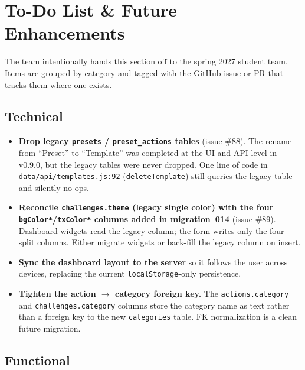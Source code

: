 \documentclass[11pt,letterpaper]{article}
\begin{document}
\section{To-Do List \& Future Enhancements}

The team intentionally hands this section off to the spring 2027
student team. Items are grouped by category and tagged with the
GitHub issue or PR that tracks them where one exists.

\subsection{Technical}

\begin{itemize}
  \item \textbf{Drop legacy \texttt{presets} / \texttt{preset\_actions}
        tables} (issue \#88). The rename from ``Preset'' to
        ``Template'' was completed at the UI and API level in
        v0.9.0, but the legacy tables were never dropped. One
        line of code in \texttt{data/api/templates.js:92}
        (\texttt{deleteTemplate}) still queries the legacy table
        and silently no-ops.
  \item \textbf{Reconcile \texttt{challenges.theme} (legacy single
        color) with the four \texttt{bgColor*}/\texttt{txColor*}
        columns added in migration~014} (issue \#89). Dashboard
        widgets read the legacy column; the form writes only the
        four split columns. Either migrate widgets or back-fill
        the legacy column on insert.
  \item \textbf{Sync the dashboard layout to the server} so it
        follows the user across devices, replacing the current
        \texttt{localStorage}-only persistence.
  \item \textbf{Tighten the action $\rightarrow$ category foreign
        key.} The \texttt{actions.category} and
        \texttt{challenges.category} columns store the category
        name as text rather than a foreign key to the new
        \texttt{categories} table. FK normalization is a clean
        future migration.
\end{itemize}

\subsection{Functional}
\end{document}
